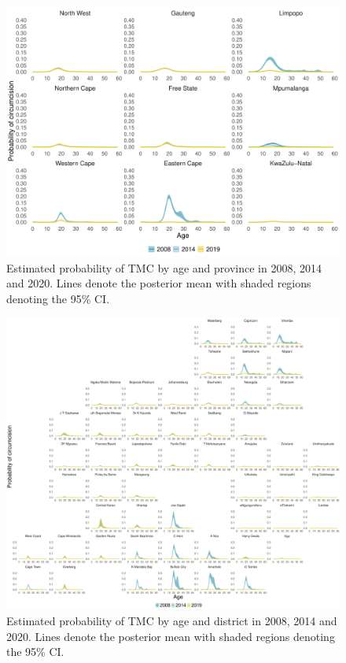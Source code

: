 \documentclass{article}
\begin{document}
\begin{appendix}
\begin{figure}[H]
	\centering
	\includegraphics[width = \linewidth]{Figures/suppmat/Rates/ProbabilityofTMC_SingleAge_Province.pdf}
	\caption{Estimated probability of TMC by age and province in 2008, 2014 and 2020. Lines denote the posterior mean with shaded regions denoting the 95\% CI.}
\end{figure}


\begin{figure}[H]
	\centering
	\includegraphics[width = \linewidth]{Figures/suppmat/Rates/ProbabilityofTMC_SingleAge_District.pdf}
	\caption{Estimated probability of TMC by age and district in 2008, 2014 and 2020. Lines denote the posterior mean with shaded regions denoting the 95\% CI.}
\end{figure}


\end{appendix}
\end{document}

